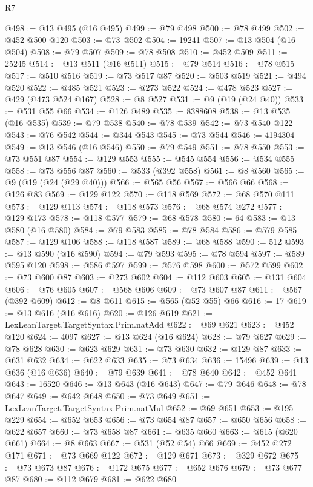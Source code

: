 \begin{lexlean}{R7}
\begin{coremodule}
@498 := @13 @495 (@16 @495)
@499 := @79 @498
@500 := @78 @499
@502 := @452 @500 @120
@503 := @73 @502
@504 := 19241
@507 := @13 @504 (@16 @504)
@508 := @79 @507
@509 := @78 @508
@510 := @452 @509
@511 := 25245
@514 := @13 @511 (@16 @511)
@515 := @79 @514
@516 := @78 @515
@517 := @510 @516
@519 := @73 @517 @87
@520 := @503 @519
@521 := @494 @520
@522 := @485 @521
@523 := @273 @522
@524 := @478 @523
@527 := @429 (@473 @524 @167)
@528 := @8 @527
@531 := @9 (@19 (@24 @40))
@533 := @531 @55 @66
@534 := @126 @489
@535 := 8388608
@538 := @13 @535 (@16 @535)
@539 := @79 @538
@540 := @78 @539
@542 := @73 @540 @122
@543 := @76 @542
@544 := @344 @543
@545 := @73 @544
@546 := 4194304
@549 := @13 @546 (@16 @546)
@550 := @79 @549
@551 := @78 @550
@553 := @73 @551 @87
@554 := @129 @553
@555 := @545 @554
@556 := @534 @555
@558 := @73 @556 @87
@560 := @533 (@392 @558)
@561 := @8 @560
@565 := @9 (@19 (@24 (@29 @40)))
@566 := @565 @56
@567 := @566 @66
@568 := @126 @83
@569 := @129 @122
@570 := @118 @569
@572 := @68 @570 @111
@573 := @129 @113
@574 := @118 @573
@576 := @68 @574 @272
@577 := @129 @173
@578 := @118 @577
@579 := @68 @578
@580 := 64
@583 := @13 @580 (@16 @580)
@584 := @79 @583
@585 := @78 @584
@586 := @579 @585
@587 := @129 @106
@588 := @118 @587
@589 := @68 @588
@590 := 512
@593 := @13 @590 (@16 @590)
@594 := @79 @593
@595 := @78 @594
@597 := @589 @595 @120
@598 := @586 @597
@599 := @576 @598
@600 := @572 @599
@602 := @73 @600 @87
@603 := @273 @602
@604 := @112 @603
@605 := @131 @604
@606 := @76 @605
@607 := @568 @606
@609 := @73 @607 @87
@611 := @567 (@392 @609)
@612 := @8 @611
@615 := @565 (@52 @55) @66
@616 := 17
@619 := @13 @616 (@16 @616)
@620 := @126 @619
@621 := LexLeanTarget.TargetSyntax.Prim.natAdd
@622 := @69 @621
@623 := @452 @120
@624 := 4097
@627 := @13 @624 (@16 @624)
@628 := @79 @627
@629 := @78 @628
@630 := @623 @629
@631 := @73 @630
@632 := @129 @87
@633 := @631 @632
@634 := @622 @633
@635 := @73 @634
@636 := 15496
@639 := @13 @636 (@16 @636)
@640 := @79 @639
@641 := @78 @640
@642 := @452 @641
@643 := 16520
@646 := @13 @643 (@16 @643)
@647 := @79 @646
@648 := @78 @647
@649 := @642 @648
@650 := @73 @649
@651 := LexLeanTarget.TargetSyntax.Prim.natMul
@652 := @69 @651
@653 := @195 @229
@654 := @652 @653
@656 := @73 @654 @87
@657 := @650 @656
@658 := @622 @657
@660 := @73 @658 @87
@661 := @635 @660
@663 := @615 (@620 @661)
@664 := @8 @663
@667 := @531 (@52 @54) @66
@669 := @452 @272 @171
@671 := @73 @669 @122
@672 := @129 @671
@673 := @329 @672
@675 := @73 @673 @87
@676 := @172 @675
@677 := @652 @676
@679 := @73 @677 @87
@680 := @112 @679
@681 := @622 @680

\end{coremodule}
\end{lexlean}
